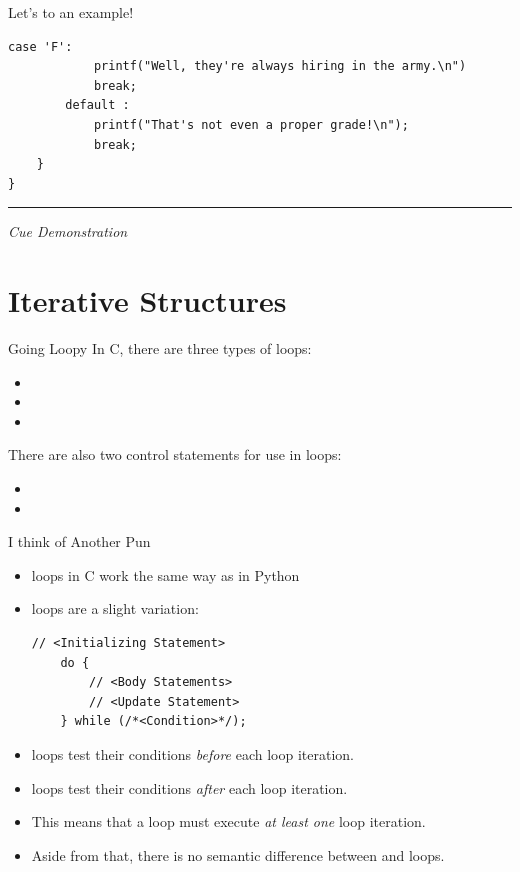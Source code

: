 \documentclass[11pt]{beamer}
\let\OldTexttt\texttt
\renewcommand{\texttt}[1]{\OldTexttt{\color{teal}{#1}}}
\begin{document}
\begin{frame}[fragile=singleslide]{Let's \texttt{switch} to an example! }
\begin{lstlisting}[style=C]
		case 'F':
			printf("Well, they're always hiring in the army.\n")
			break;
		default :
			printf("That's not even a proper grade!\n");
			break;
	}
}
\end{lstlisting}
\hrule
\vspace{1em}
\emph{Cue Demonstration}
\end{frame}

\section[Loops]{Iterative Structures}
\begin{frame}{Going Loopy}
In C, there are three types of loops: 
\begin{itemize}
\item \texttt{while}
\item \texttt{do while}
\item \texttt{for}
\end{itemize}
There are also two control statements for use in loops:
\begin{itemize}
\item \texttt{break;}
\item \texttt{continue;}
\end{itemize}
\end{frame}

\begin{frame}[fragile=singleslide]{\texttt{do while} I think of Another Pun}
\begin{itemize}
\item \texttt{while} loops in C work the same way as in Python 
\item \texttt{do while} loops are a slight variation:
\begin{lstlisting}[style=C]
	// <Initializing Statement>
	do {
		// <Body Statements>
		// <Update Statement>
	} while (/*<Condition>*/); 
\end{lstlisting}
\item \texttt{while} loops test their conditions \emph{before} each loop iteration.
\item \texttt{do while} loops test their conditions \emph {after} each loop iteration.
\item This means that a \texttt{do while} loop must execute \emph{at least one} loop iteration.  
\item Aside from that, there is no semantic difference between \texttt{while} and \texttt{do while} loops.  
\end{itemize}
\end{frame}
\end{document}
